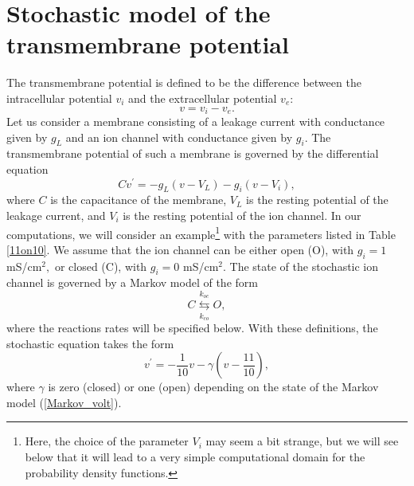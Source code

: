 \section[Stochastic model]{Stochastic model of the transmembrane potential}

The transmembrane potential is defined to be the difference between the
intracellular potential $v_{i}$ and the extracellular potential $v_{e}$:%
\begin{equation}
v=v_{i}-v_{e}. \label{v0}%
\end{equation}
Let us consider a membrane consisting of a leakage current with conductance
given by $g_{L}$ and an ion channel with conductance given by $g_{i}.$ The
transmembrane potential of such a membrane is governed by the
differential equation%
\begin{equation}
Cv^{\prime}=-g_{L}\left(  v-V_{L}\right)  -g_{i}(v-V_{i}), \label{v1}%
\end{equation}
where $C$ is the capacitance of the membrane, $V_{L}$ is the resting potential
of the leakage current, and $V_{i}$ is the resting potential of the ion
channel. In our computations, we will consider an example\footnote{Here, the choice of the parameter $V_i$ may seem a bit strange, but we will see below that it will lead to a very simple computational domain for the probability density functions.} 
with the parameters listed in Table \ref{11on10}.
We assume that the ion channel can be either open (O), with $g_{i}=1$ mS/cm$^{2},$ or
closed (C), with $g_{i}=0$ mS/cm$^{2}$. The state of the stochastic ion channel is governed
by a Markov model of the form%
\begin{equation}
C\underset{k_{co}}{\overset{k_{oc}}{\leftrightarrows}}O, \label{Markov_volt}%
\end{equation}
where the reactions rates will be specified below. With these definitions, the
stochastic equation takes the form%
\begin{equation}
v^{\prime}=-\frac{1}{10}v-\gamma\left(  v-\frac{11}{10}\right),  \label{v2}%
\end{equation}
where $\gamma$ is zero (closed) or one (open) depending on the state of the Markov model (\ref{Markov_volt}).

